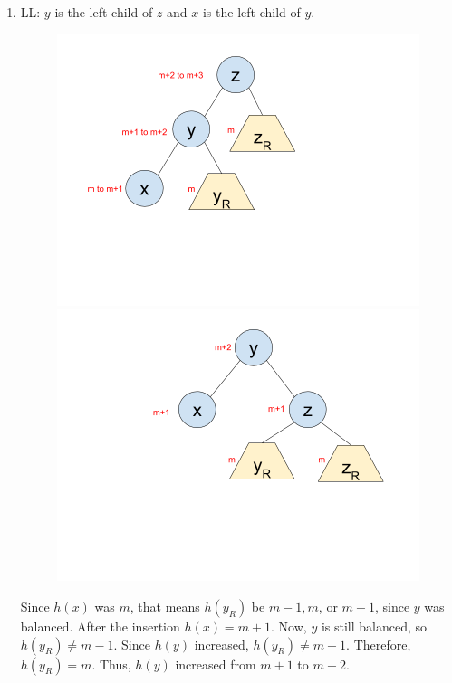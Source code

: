 \documentclass[12pt]{article}
\begin{document}
\begin{enumerate}
  \item LL: $y$ is the left child of $z$ and $x$ is the left child of $y$.

  \begin{figure}
    \centering
    \includegraphics[trim=50 50 150 40, clip,scale=0.33]{pics/avl_insert_ll1}
    \includegraphics[trim=250 50 50 40, clip,scale=0.33]{pics/avl_insert_ll2}
  \end{figure}

  Since $h(x)$ was $m$, that means $h(y_R)$ be $m-1, m$, or $m+1$, since $y$ was balanced. After the insertion $h(x) = m+1$. Now, $y$ is still balanced, so $h(y_R) \neq m-1$. Since $h(y)$ increased, $h(y_R) \neq m+1$. Therefore, $h(y_R) = m$. Thus, $h(y)$ increased from $m+1$ to $m+2$.


\end{enumerate}
\end{document}
